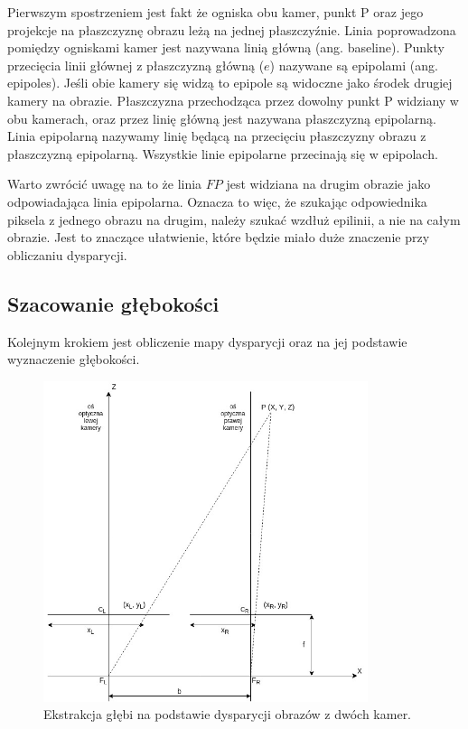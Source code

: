 \documentclass{article}
\begin{document}
Pierwszym spostrzeniem jest fakt że ogniska obu kamer, punkt P oraz jego projekcje na płaszczyznę obrazu leżą na jednej płaszczyźnie. Linia poprowadzona pomiędzy ogniskami kamer jest nazywana linią główną (ang. baseline). 
Punkty przecięcia linii głównej z płaszczyzną główną ($e$) nazywane są epipolami (ang. epipoles). Jeśli obie kamery się widzą to epipole są widoczne jako środek drugiej kamery na obrazie.
Płaszczyzna przechodząca przez dowolny punkt P widziany w obu kamerach, oraz przez linię główną jest nazywana płaszczyzną epipolarną.
Linia epipolarną nazywamy linię będącą na przecięciu płaszczyzny obrazu z płaszczyzną epipolarną. Wszystkie linie epipolarne przecinają się w epipolach.

Warto zwrócić uwagę na to że linia $F P$ jest widziana na drugim obrazie jako odpowiadająca linia epipolarna. Oznacza to więc, że szukając odpowiednika piksela z jednego obrazu na drugim, należy szukać wzdłuż epilinii, a nie na całym obrazie. Jest to znaczące ułatwienie, które będzie miało duże znaczenie przy obliczaniu dysparycji.

\subsection{Szacowanie głębokości}

Kolejnym krokiem jest obliczenie mapy dysparycji oraz na jej podstawie wyznaczenie głębokości. 

\begin{figure}
	\centering
	\includegraphics[width=9.5cm]{ekstrakcja.jpg}
	\caption{Ekstrakcja głębi na podstawie dysparycji obrazów z dwóch kamer. }
	\label{fig:extraction}
\end{figure}
\end{document}
